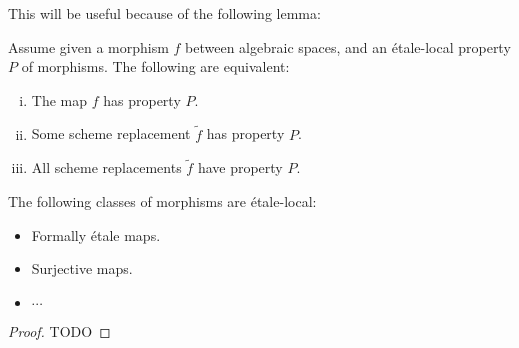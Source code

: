 This will be useful because of the following lemma:

\begin{lemma}
Assume given a morphism $f$ between algebraic spaces, and an étale-local property $P$ of morphisms. The following are equivalent:
\begin{enumerate}[(i)]
\item The map $f$ has property $P$. 
\item Some scheme replacement $\widetilde{f}$ has property $P$. 
\item All scheme replacements $\widetilde{f}$ have property $P$. 
\end{enumerate}
\end{lemma}

\begin{lemma}
The following classes of morphisms are étale-local:
\begin{itemize}
\item Formally étale maps.
\item Surjective maps.
\item $\cdots$
\end{itemize}
\end{lemma}

\begin{proof}
TODO
\end{proof}
